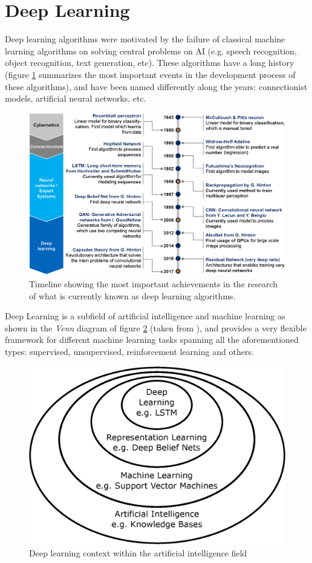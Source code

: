 \section{Deep Learning}

Deep learning algorithms were motivated by the failure of classical machine learning algorithms on solving central problems on AI (e.g. speech recognition, object recognition, text generation, etc). These algorithms have a long history (figure \ref{fig:dl-timeline} summarizes the most important events in the development process of these algorithms), and have been named differently along the years: connectionist models, artificial neural networks, etc.  

\begin{figure}
	\centering
	\includegraphics[width=1.0\linewidth]{chapter2/images/DL-timeline}
	\caption{Timeline showing the most important achievements in the research of what is currently known as deep learning algorithms.}
	\label{fig:dl-timeline}
\end{figure}


Deep Learning is a subfield of artificial intelligence and machine learning as shown in the \textit{Venn} diagram of figure \ref{fig:venndl} (taken from \cite{Goodfellow2016}), and provides a very flexible framework for different machine learning tasks spanning all the aforementioned types: supervised, unsupervised, reinforcement learning and others.

\begin{figure}
	\centering
	\includegraphics[width=0.5\linewidth]{chapter2/images/venn_DL}
	\caption{Deep learning context within the artificial intelligence field \cite{Goodfellow2016}}
	\label{fig:venndl}
\end{figure}



